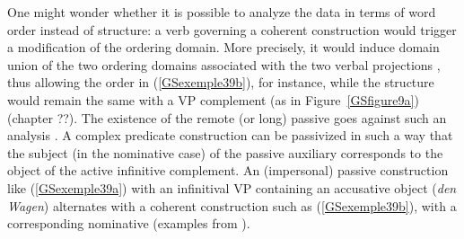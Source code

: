 \documentclass[output=paper
                ,modfonts
                ,nonflat
	        ,collection
	        ,collectionchapter
	        ,collectiontoclongg
 	        ,biblatex
                ,babelshorthands
                ,newtxmath
                ,draftmode
                ,colorlinks, citecolor=brown
]{./langsci/langscibook}
\begin{document}
{One might wonder whether it is possible to analyze the data in terms of word order instead of structure: a verb governing a coherent construction would trigger a modification of the ordering domain. More precisely, it would induce domain union of the two ordering domains associated with the two verbal projections \citep{Reape94a}, thus allowing the order in (\ref{GSexemple39b}), for instance, while the structure would remain the same with a VP complement (as in Figure~\ref{GSfigure9a}) (chapter ??). The existence of the remote (or long) passive goes against such an analysis \citep{HN94a, Kathol98b, Mueller2002b}. A complex predicate construction can be passivized in such a way that the subject (in the nominative case) of the passive auxiliary corresponds to the object of the active infinitive complement. An (impersonal) passive construction like (\ref{GSexemple39a}) with an infinitival VP containing an accusative object (\textit{den Wagen}) alternates with a coherent construction such as (\ref{GSexemple39b}), with a corresponding nominative (examples from \citealt{Mueller2002b}). 

\begin{exe}
	\ex \label{GSexemple39} 
	\begin{xlist}
        \label{GSexemple39a}

        \label{GSexemple39b}

		\label{GSexemple39c}	
		
		\label{GSexemple39d}
		
		\end{xlist}
\end{exe}

}
\end{document}
